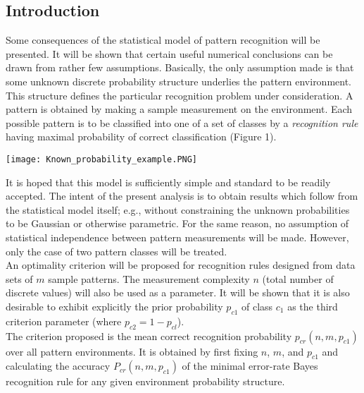\documentclass[10pt, a4paper]{article}
\begin{document}
\begin{CJK*}{UTF8}{bsmi}
\begin{multicols}{2}
\section{Introduction}
\hspace*{1em} Some consequences of the statistical model of pattern recognition will be presented.
It will be shown that certain useful numerical conclusions can be drawn from rather few assumptions. 
Basically, the only assumption made is that some unknown discrete probability structure underlies the pattern environment. 
This structure defines the particular recognition problem under consideration.
A pattern is obtained by making a sample measurement on the environment. 
Each possible pattern is to be classified into one of a set of classes by a \textit{recognition rule} having maximal probability of correct classification (Figure 1). \\
\begin{center}
    \texttt{[image: Known\_probability\_example.PNG]}
    \label{fig:Know_Probability_Example}
\end{center}
\hspace*{1em} It is hoped that this model is sufficiently simple and standard to be readily accepted. 
The intent of the present analysis is to obtain results which follow from the statistical model itself; e.g., without constraining the unknown probabilities to be Gaussian or otherwise parametric. 
For the same reason, no assumption of statistical independence between pattern measurements will be made. 
However, only the case of two pattern classes will be treated. \\
\hspace*{1em} An optimality criterion will be proposed for recognition rules designed from data sets of $m$ sample patterns. 
The measurement complexity $n$ (total number of discrete values) will also be used as a parameter. 
It will be shown that it is also desirable to exhibit explicitly the prior probability $p_{c1}$ of class $c_1$ as the third criterion parameter (where $p_{c2} = 1 - p_{cl}$). \\
\hspace*{1em}The criterion proposed is the mean correct recognition probability $p_{cr}(n, m, p_{c1})$ over all pattern environments. 
It is obtained by first fixing $n$, $m$, and $p_{c1}$ and calculating the accuracy $P_{cr}(n, m, p_{c1})$ of the minimal error-rate Bayes recognition rule for any given environment probability structure. 

\end{multicols}
\end{CJK*}
\end{document}
